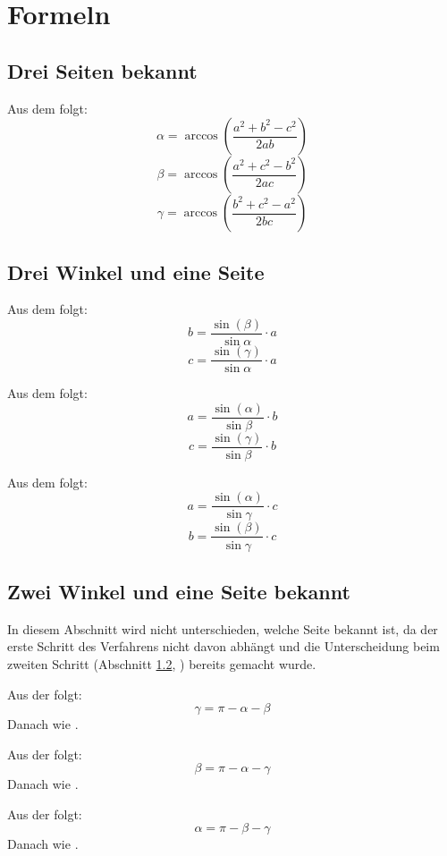\documentclass[ngerman,12pt]{scrartcl}
\begin{document}
\section{Formeln}
\subsection{Drei Seiten bekannt}

\begin{fall}[a,b,c]\label{abc}
Aus dem  folgt:
$$ \alpha =  \arccos \left( \frac{a^2 + b^2 -c^2}{2ab} \right)$$
$$ \beta =  \arccos \left( \frac{a^2 + c^2 - b^2}{2ac} \right)$$
$$ \gamma =  \arccos \left( \frac{b^2 + c^2 -a^2}{2bc} \right)$$
\end{fall}

\subsection{Drei Winkel und eine Seite}\label{wwws}
\begin{fall}\label{axyz}
Aus dem  folgt:
$$b = \frac{\sin(\beta)}{\sin{\alpha}} \cdot a $$
$$c = \frac{\sin(\gamma)}{\sin{\alpha}} \cdot a $$
\end{fall}
\begin{fall}\label{bxyz}
Aus dem  folgt:
$$a = \frac{\sin(\alpha)}{\sin{\beta}} \cdot b $$
$$c = \frac{\sin(\gamma)}{\sin{\beta}} \cdot b $$
\end{fall}
\begin{fall}\label{cxyz}
Aus dem  folgt:
$$a = \frac{\sin(\alpha)}{\sin{\gamma}} \cdot c $$
$$b = \frac{\sin(\beta)}{\sin{\gamma}} \cdot c $$
\end{fall}


\subsection{Zwei Winkel und eine Seite bekannt}
In diesem Abschnitt wird nicht unterschieden, welche Seite bekannt ist, da der erste Schritt des Verfahrens nicht davon abhängt und die Unterscheidung beim zweiten Schritt (Abschnitt \ref{wwws}, ) bereits  gemacht wurde.

\begin{fall}[$\alpha, \beta$]\label{xy}
Aus der  folgt:
$$\gamma = \pi - \alpha - \beta $$
Danach wie .
\end{fall}
\begin{fall}[$\alpha, \gamma$]\label{xz}
Aus der  folgt:
$$\beta = \pi - \alpha - \gamma $$
Danach wie .
\end{fall}
\begin{fall}[$\beta, \gamma$]\label{yz}
Aus der  folgt:
$$\alpha = \pi - \beta - \gamma $$
Danach wie .
\end{fall}
\end{document}
